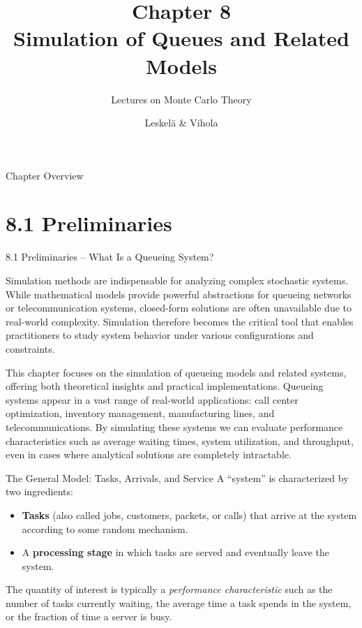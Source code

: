 \documentclass[aspectratio=169,10pt]{beamer}
\title[Ch.8: Simulation of Queues]{Chapter 8\\Simulation of Queues and Related Models}
\subtitle{Lectures on Monte Carlo Theory}
\author{Leskel\"{a} \& Vihola}
\date{}
\begin{document}
\begin{frame}
  \titlepage
\end{frame}

\begin{frame}{Chapter Overview}
  \tableofcontents
\end{frame}

\section{8.1 Preliminaries}

\begin{frame}[allowframebreaks]{8.1 Preliminaries -- What Is a Queueing System?}

Simulation methods are indispensable for analyzing complex stochastic systems.
While mathematical models provide powerful abstractions for queueing networks or
telecommunication systems, closed-form solutions are often unavailable due to
real-world complexity.  Simulation therefore becomes the critical tool that enables
practitioners to study system behavior under various configurations and constraints.

This chapter focuses on the simulation of queueing models and related systems,
offering both theoretical insights and practical implementations.  Queueing systems
appear in a vast range of real-world applications: call center optimization,
inventory management, manufacturing lines, and telecommunications.  By simulating
these systems we can evaluate performance characteristics such as average waiting
times, system utilization, and throughput, even in cases where analytical solutions
are completely intractable.

\begin{block}{The General Model: Tasks, Arrivals, and Service}
A ``system'' is characterized by two ingredients:
\begin{itemize}
  \item \textbf{Tasks} (also called jobs, customers, packets, or calls) that arrive
        at the system according to some random mechanism.
  \item A \textbf{processing stage} in which tasks are served and eventually
        leave the system.
\end{itemize}
The quantity of interest is typically a \emph{performance characteristic} such
as the number of tasks currently waiting, the average time a task spends in the
system, or the fraction of time a server is busy.
\end{block}


\end{frame}
\end{document}
